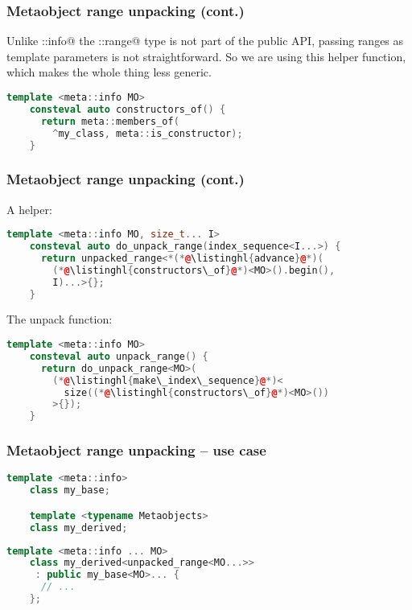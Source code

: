 \documentclass[compress,table,xcolor=table]{beamer}
\begin{document}
\begin{frame}[fragile]
    \frametitle{Metaobject range unpacking (cont.)}
  \Large
  Unlike \verb@meta::info@ the \verb@detail::range@ type is not part of the
    public API, passing ranges as template parameters is not straightforward.
  \vfill
  So we are using this helper function, which makes the whole thing less generic.
    \begin{lstlisting}[language=c++]
    template <meta::info MO>
    consteval auto constructors_of() {
      return meta::members_of(
        ^my_class, meta::is_constructor);
    }
    \end{lstlisting}
\end{frame}
\begin{frame}[fragile]
\frametitle{Metaobject range unpacking (cont.)}
    \large
    A helper:
    \begin{lstlisting}[language=c++]
    template <meta::info MO, size_t... I>
    consteval auto do_unpack_range(index_sequence<I...>) {
      return unpacked_range<*(*@\listinghl{advance}@*)(
        (*@\listinghl{constructors\_of}@*)<MO>().begin(),
        I)...>{};
    }
    \end{lstlisting}
    \vfill
    The unpack function:
    \begin{lstlisting}[language=c++]
    template <meta::info MO>
    consteval auto unpack_range() {
      return do_unpack_range<MO>(
		(*@\listinghl{make\_index\_sequence}@*)<
          size((*@\listinghl{constructors\_of}@*)<MO>())
        >{});
    }
    \end{lstlisting}
\end{frame}
\begin{frame}[fragile]
\frametitle{Metaobject range unpacking -- use case}
    \begin{lstlisting}[language=c++]
    template <meta::info>
    class my_base;

    template <typename Metaobjects>
    class my_derived;
    \end{lstlisting}

    \begin{lstlisting}[language=c++]
    template <meta::info ... MO>
    class my_derived<unpacked_range<MO...>>
     : public my_base<MO>... {
      // ...
    };
    \end{lstlisting}
\end{frame}
\end{document}
